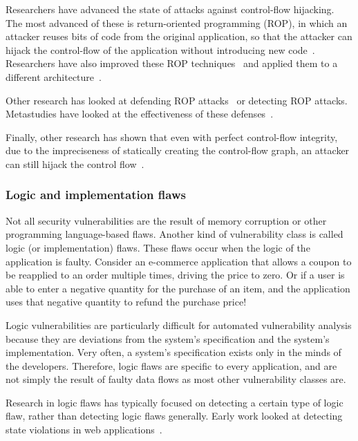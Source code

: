 \documentclass[11pt,letterpaper]{article}
\begin{document}
Researchers have advanced the state of attacks against control-flow
hijacking. The most advanced of these is return-oriented programming
(ROP), in which an attacker reuses bits of code from the original
application, so that the attacker can hijack the control-flow of the
application without introducing new code~\cite{roemer2012,
  bletsch2010, tran2011}. Researchers have also improved these ROP
techniques~\cite{checkoway2010, buchanan2008, kayaalp2012, chen2012,
  goktas2014, schwartz2011} and applied them to a different
architecture~\cite{davi2012}.

Other research has looked at defending ROP attacks~\cite{pappas2012,
  davi2009, davi2011, onarlioglu2010, gupta2013, pappas2012, lu2011,
  lu2011a, homescu2012, gokta2014, cheng2014, pappas2013, snow2013,
  hiser2012, wartell2012} or detecting ROP
attacks\cite{polychronakis2011}. Metastudies have looked at the
effectiveness of these defenses~\cite{skowyra2013, schuster2014}.

Finally, other research has shown that even with perfect control-flow
integrity, due to the impreciseness of statically creating the
control-flow graph, an attacker can still hijack the control
flow~\cite{carlini2015, schuster2015, carlini2014, davi2014}.

\subsubsection{Logic and implementation flaws}

Not all security vulnerabilities are the result of memory corruption
or other programming language-based flaws. Another kind of
vulnerability class is called logic (or implementation) flaws. These
flaws occur when the logic of the application is faulty. Consider an
e-commerce application that allows a coupon to be reapplied to an order
multiple times, driving the price to zero. Or if a user is able to
enter a negative quantity for the purchase of an item, and the
application uses that negative quantity to refund the purchase price!

Logic vulnerabilities are particularly difficult for automated
vulnerability analysis because they are deviations from the
system's specification and the system's implementation. Very often, a
system's specification exists only in the minds of the developers.
Therefore, logic flaws are specific to every application, and are not
simply the result of faulty data flows as most other vulnerability
classes are.

Research in logic flaws has typically focused on detecting a certain
type of logic flaw, rather than detecting logic flaws generally. Early
work looked at detecting state violations in web
applications~\cite{cova2007}.
\end{document}
